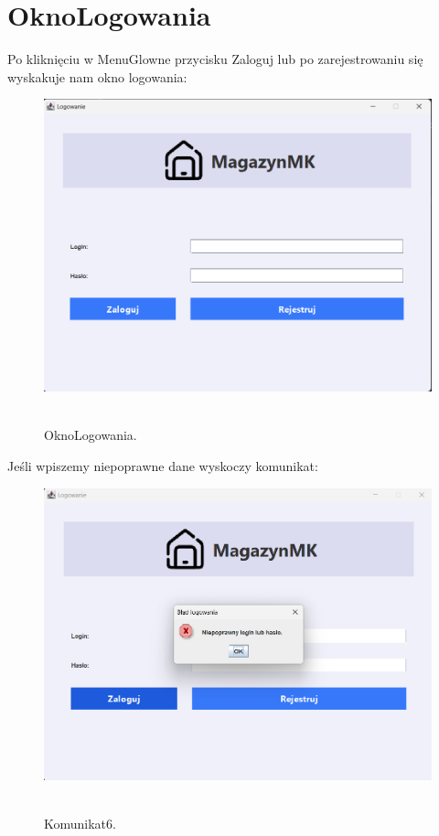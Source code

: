 \section{OknoLogowania}
\label{sec:OknoLogowania}
Po kliknięciu w MenuGlowne przycisku Zaloguj lub po zarejestrowaniu się wyskakuje nam okno logowania:
\begin{figure}[H]
    \centering
    \includegraphics[width=.7\linewidth]{figures/OknoLogowania.png}\
    \caption{OknoLogowania.\label{OknoLogowania}}
\end{figure}
Jeśli wpiszemy niepoprawne dane wyskoczy komunikat:
\begin{figure}[H]
    \centering
    \includegraphics[width=.7\linewidth]{figures/LogowanieKomunikat.png}\
    \caption{Komunikat6.\label{Komunikat6}}
\end{figure}
\clearpage

